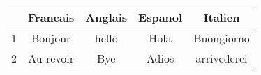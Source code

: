 \documentclass[12pt,a4paper]{article}
\begin{document}
	\begin{table}[ht]
   		\centering
   		\begin{tabular}{|r|c|c|c|c|}
  			\hline
\rowcolor[gray]{0.85} &	Francais & Anglais & Espanol & Italien \\
		   \hline 
			1 & Bonjour  &\cellcolor{red} hello & Hola & Buongiorno \\
			\hline
			2 & Au revoir & Bye & Adios & arrivederci \\
		   \hline

   		\end{tabular}
	\end{table}

\end{document}
